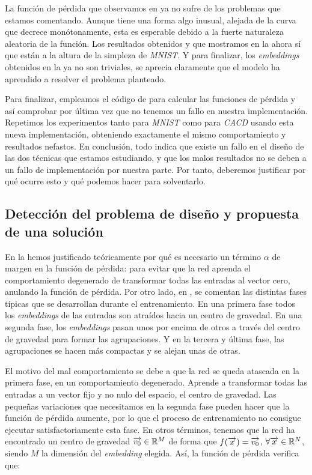 La función de pérdida que observamos en  ya no sufre de los problemas que estamos comentando. Aunque tiene una forma algo inusual, alejada de la curva que decrece monótonamente, esta es esperable debido a la fuerte naturaleza aleatoria de la función. Los resultados obtenidos y que mostramos en la  ahora sí que están a la altura de la simpleza de \textit{MNIST}. Y para finalizar, los \textit{embeddings} obtenidos en la  ya no son triviales, se aprecia claramente que el modelo ha aprendido a resolver el problema planteado.

Para finalizar, empleamos el código de \cite{informatica:implementacion_batch_distancias} para calcular las funciones de pérdida y así comprobar por última vez que no tenemos un fallo en nuestra implementación. Repetimos los experimentos tanto para \textit{MNIST} como para \textit{CACD} usando esta nueva implementación, obteniendo exactamente el mismo comportamiento y resultados nefastos. En conclusión, todo indica que existe un fallo en el diseño de las dos técnicas que estamos estudiando, y que los malos resultados no se deben a un fallo de implementación por nuestra parte. Por tanto, deberemos justificar por qué ocurre esto y qué podemos hacer para solventarlo.

\subsection{Detección del problema de diseño y propuesta de una solución} \label{isubsec:identificacion_problemas_propuesta_solucion}

En la  hemos justificado teóricamente por qué es necesario un término $\alpha$ de margen en la función de pérdida: para evitar que la red aprenda el comportamiento degenerado de transformar todas las entradas al vector cero, anulando la función de pérdida. Por otro lado, en \cite{informatica:principal}, se comentan las distintas fases típicas que se desarrollan durante el entrenamiento. En una primera fase todos los \textit{embeddings} de las entradas son atraídos hacia un centro de gravedad. En una segunda fase, los \textit{embeddings} pasan unos por encima de otros a través del centro de gravedad para formar las agrupaciones. Y en la tercera y última fase, las agrupaciones se hacen más compactas y se alejan unas de otras.

El motivo del mal comportamiento se debe a que la red se queda atascada en la primera fase, en un comportamiento degenerado. Aprende a transformar todas las entradas a un vector fijo y no nulo del espacio, el centro de gravedad. Las pequeñas variaciones que necesitamos en la segunda fase pueden hacer que la función de pérdida aumente, por lo que el proceso de entrenamiento no consigue ejecutar satisfactoriamente esta fase. En otros términos, tenemos que la red ha encontrado un centro de gravedad $\overrightarrow{v_0} \in \mathbb{R}^M$ de forma que $f(\overrightarrow{x}) = \overrightarrow{v_0}$, $\forall \overrightarrow{x} \in \mathbb{R}^N$, siendo $M$ la dimensión del \textit{embedding} elegida. Así, la función de pérdida verifica que:

